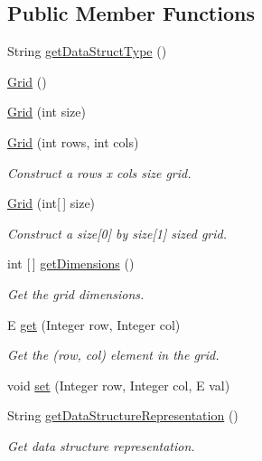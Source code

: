 \subsection*{Public Member Functions}
\begin{DoxyCompactItemize}
\item 
String \hyperlink{classbridges_1_1base_1_1_grid_a81f268dd27c292ff2af9358039d4ebe6}{get\+Data\+Struct\+Type} ()
\item 
\hyperlink{classbridges_1_1base_1_1_grid_aa621ffc958db8341f7ce37ed78944d51}{Grid} ()
\item 
\hyperlink{classbridges_1_1base_1_1_grid_a9818d4959813f1292c6a234bc6f6aa9e}{Grid} (int size)
\item 
\hyperlink{classbridges_1_1base_1_1_grid_a43a699bd7ae2c6c986f978c515ff97d8}{Grid} (int rows, int cols)
\begin{DoxyCompactList}\small\item\em Construct a rows x cols size grid. \end{DoxyCompactList}\item 
\hyperlink{classbridges_1_1base_1_1_grid_ab9975b28d8dda7f3fbe0e35a7a026772}{Grid} (int\mbox{[}$\,$\mbox{]} size)
\begin{DoxyCompactList}\small\item\em Construct a size\mbox{[}0\mbox{]} by size\mbox{[}1\mbox{]} sized grid. \end{DoxyCompactList}\item 
int \mbox{[}$\,$\mbox{]} \hyperlink{classbridges_1_1base_1_1_grid_aee8a5b66095d65ff067a4e76f2611b0e}{get\+Dimensions} ()
\begin{DoxyCompactList}\small\item\em Get the grid dimensions. \end{DoxyCompactList}\item 
E \hyperlink{classbridges_1_1base_1_1_grid_a698579bb5b7166f76a18a1b04916e090}{get} (Integer row, Integer col)
\begin{DoxyCompactList}\small\item\em Get the (row, col) element in the grid. \end{DoxyCompactList}\item 
void \hyperlink{classbridges_1_1base_1_1_grid_ab79ceb737423bb28ea2348e61a625a17}{set} (Integer row, Integer col, E val)
\item 
String \hyperlink{classbridges_1_1base_1_1_grid_a9a7faf2bbabae8d2f2babe9e29deb2c8}{get\+Data\+Structure\+Representation} ()
\begin{DoxyCompactList}\small\item\em Get data structure representation. \end{DoxyCompactList}\end{DoxyCompactItemize}
